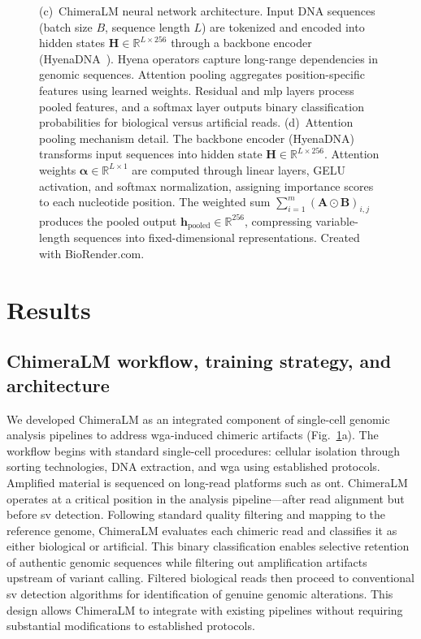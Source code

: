 \documentclass[pdflatex,sn-nature,lineno]{sn-jnl}%
\theoremstyle{thmstyleone}%
\theoremstyle{thmstyletwo}%
\theoremstyle{thmstylethree}%
\begin{document}
\begin{figure}[p]
{		(c)~ChimeraLM neural network architecture. Input DNA sequences (batch size $B$, sequence length $L$) are tokenized and encoded into hidden states $\mathbf{H} \in \mathbb{R}^{L \times 256}$ through a backbone encoder (HyenaDNA~\cite{nguyen2023hyenadna}). Hyena operators capture long-range dependencies in genomic sequences. Attention pooling aggregates position-specific features using learned weights. Residual and \gls{mlp} layers process pooled features, and a softmax layer outputs binary classification probabilities for biological versus artificial reads.
		(d)~Attention pooling mechanism detail. The backbone encoder (HyenaDNA) transforms input sequences into hidden state $\mathbf{H} \in \mathbb{R}^{L \times 256}$. Attention weights $\boldsymbol{\alpha} \in \mathbb{R}^{L \times 1}$ are computed through linear layers, GELU activation, and softmax normalization, assigning importance scores to each nucleotide position. The weighted sum $\sum_{i=1}^{m} (\mathbf{A} \odot \mathbf{B})_{i,j}$ produces the pooled output $\mathbf{h}_{\text{pooled}} \in \mathbb{R}^{256}$, compressing variable-length sequences into fixed-dimensional representations.
		Created with BioRender.com.} 
	\label{fig:figure1}
\end{figure}

\section*{Results}\label{sec:results}

\subsection*{ChimeraLM workflow, training strategy, and architecture}

We developed ChimeraLM as an integrated component of single-cell genomic analysis pipelines to address \gls{wga}-induced chimeric artifacts (Fig.~\ref{fig:figure1}a).
The workflow begins with standard single-cell procedures: cellular isolation through sorting technologies, DNA extraction, and \gls{wga} using established protocols.
Amplified material is sequenced on long-read platforms such as \gls{ont}.
ChimeraLM operates at a critical position in the analysis pipeline—after read alignment but before \gls{sv} detection.
Following standard quality filtering and mapping to the reference genome, ChimeraLM evaluates each chimeric read and classifies it as either biological or artificial.
This binary classification enables selective retention of authentic genomic sequences while filtering out amplification artifacts upstream of variant calling.
Filtered biological reads then proceed to conventional \gls{sv} detection algorithms for identification of genuine genomic alterations.
This design allows ChimeraLM to integrate with existing pipelines without requiring substantial modifications to established protocols.
\end{document}
